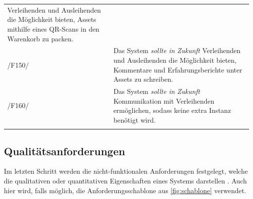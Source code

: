 \begin{center}
\begin{longtable}{lp{}}
                Verleihenden und Ausleihenden die Möglichkeit bieten, Assets mithilfe eines
                QR-Scans in den Warenkorb zu packen.                                                    \\
                \sffamily\color{maincolor}/F150/ & Das System \textit{sollte in Zukunft}
                Verleihenden und Ausleihenden die Möglichkeit bieten, Kommentare und
                Erfahrungsberichte unter Assets zu schreiben.                                           \\
                \sffamily\color{maincolor}/F160/ & Das System \textit{sollte in Zukunft}
                Kommunikation mit Verleihenden ermöglichen, sodass keine extra Instanz benötigt
                wird.                                                                                   \\
                \arrayrulecolor{maincolor}\hline
        \end{longtable}
\end{center}

\vspace*{-1.5cm}
\subsection{Qualitätsanforderungen}
\label{section:qualität}
Im letzten Schritt werden die nicht-funktionalen Anforderungen festgelegt, welche die qualitativen
oder quantitativen Eigenschaften eines Systems darstellen \cite{balzert2009}. Auch hier wird, falls
möglich, die Anforderungsschablone aus \ref{fig:schablone} verwendet.

